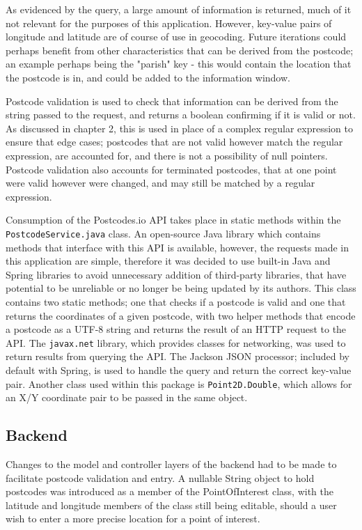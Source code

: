 As evidenced by the query, a large amount of information is returned, much of it not relevant for the purposes of this application. However, key-value pairs of longitude and latitude are of course of use in geocoding. Future iterations could perhaps benefit from other characteristics that can be derived from the postcode; an example perhaps being the "parish" key - this would contain the location that the postcode is in, and could be added to the information window.

Postcode validation is used to check that information can be derived from the string passed to the request, and returns a boolean confirming if it is valid or not. As discussed in chapter 2, this is used in place of a complex regular expression to ensure that edge cases; postcodes that are not valid however match the regular expression, are accounted for, and there is not a possibility of null pointers. Postcode validation also accounts for terminated postcodes, that at one point were valid however were changed, and may still be matched by a regular expression.

Consumption of the Postcodes.io API takes place in static methods within the \texttt{PostcodeService.java} class. An open-source Java library which contains methods that interface with this API is available, however, the requests made in this application are simple, therefore it was decided to use built-in Java and Spring libraries to avoid unnecessary addition of third-party libraries, that have potential to be unreliable or no longer be being updated by its authors. This class contains two static methods; one that checks if a postcode is valid and one that returns the coordinates of a given postcode, with two helper methods that encode a postcode as a UTF-8 string and returns the result of an HTTP request to the API. The \texttt{javax.net} library, which provides classes for networking, was used to return results from querying the API. The Jackson JSON processor; included by default with Spring, is used to handle the query and return the correct key-value pair. Another class used within this package is \texttt{Point2D.Double}, which allows for an X/Y coordinate pair to be passed in the same object.

\subsection{Backend}

Changes to the model and controller layers of the backend had to be made to facilitate postcode validation and entry. A nullable String object to hold postcodes was introduced as a member of the PointOfInterest class, with the latitude and longitude members of the class still being editable, should a user wish to enter a more precise location for a point of interest.

